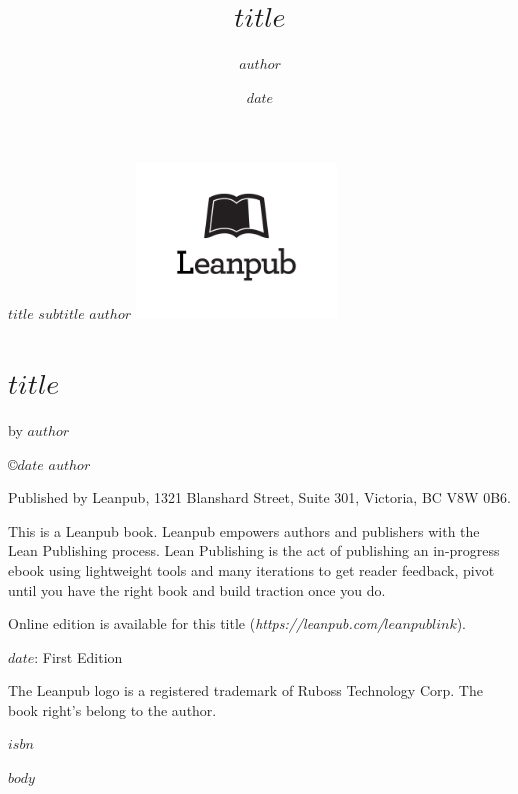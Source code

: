 \documentclass[$paper$, $fontsize$, $onetwoside$]{scrbook}
\author{$author$}
\title{$title$}
\date{$date$}
\renewcommand{\maketitle}{%
  \begin{titlepage}
    \begin{center}
      \vfill
      \Huge
      \textbf{$title$}
      \vfill
      \LARGE
      $subtitle$
      \vfill
      \textbf{$author$}
      \vfill
      \includegraphics[width=0.4\textwidth]{figures/leanpub.pdf}
      \vfill
    \end{center}
  \end{titlepage}
}
\begin{document}
  \begin{center}\end{center} %
  \cleardoublepage
  \newpage

  \maketitle

  \chapter*{$title$}

  by $author$

  \copyright $date$ $author$

  Published by Leanpub, 1321 Blanshard Street, Suite 301, Victoria, BC V8W 0B6.
  
  This is a Leanpub book. Leanpub empowers authors and publishers with the Lean
  Publishing process. Lean Publishing is the act of publishing an in-progress
  ebook using lightweight tools and many iterations to get reader feedback, pivot
  until you have the right book and build traction once you do.

  Online edition is available for this title
  (\emph{https://leanpub.com/$leanpublink$}).

  $date$: First Edition

  The Leanpub logo is a registered trademark of Ruboss Technology Corp. The
  book right's belong to the author.

  $isbn$

  \newpage

  \tableofcontents

  \mainmatter

  $body$
  
  \appendix
\end{document}
